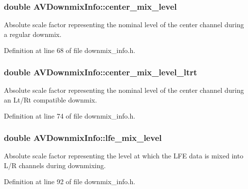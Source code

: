 \subsubsection[{\texorpdfstring{center\+\_\+mix\+\_\+level}{center_mix_level}}]{\setlength{\rightskip}{0pt plus 5cm}double A\+V\+Downmix\+Info\+::center\+\_\+mix\+\_\+level}\hypertarget{struct_a_v_downmix_info_ac895caaffbfe271f3b710453a5e4db52}{}\label{struct_a_v_downmix_info_ac895caaffbfe271f3b710453a5e4db52}
Absolute scale factor representing the nominal level of the center channel during a regular downmix. 

Definition at line 68 of file downmix\+\_\+info.\+h.

\subsubsection[{\texorpdfstring{center\+\_\+mix\+\_\+level\+\_\+ltrt}{center_mix_level_ltrt}}]{\setlength{\rightskip}{0pt plus 5cm}double A\+V\+Downmix\+Info\+::center\+\_\+mix\+\_\+level\+\_\+ltrt}\hypertarget{struct_a_v_downmix_info_afe5bab2b99df66c400d53acef4e67ab7}{}\label{struct_a_v_downmix_info_afe5bab2b99df66c400d53acef4e67ab7}
Absolute scale factor representing the nominal level of the center channel during an Lt/\+Rt compatible downmix. 

Definition at line 74 of file downmix\+\_\+info.\+h.

\subsubsection[{\texorpdfstring{lfe\+\_\+mix\+\_\+level}{lfe_mix_level}}]{\setlength{\rightskip}{0pt plus 5cm}double A\+V\+Downmix\+Info\+::lfe\+\_\+mix\+\_\+level}\hypertarget{struct_a_v_downmix_info_a070b6f29f4a4d272894d60d678a13a03}{}\label{struct_a_v_downmix_info_a070b6f29f4a4d272894d60d678a13a03}
Absolute scale factor representing the level at which the L\+FE data is mixed into L/R channels during downmixing. 

Definition at line 92 of file downmix\+\_\+info.\+h.

